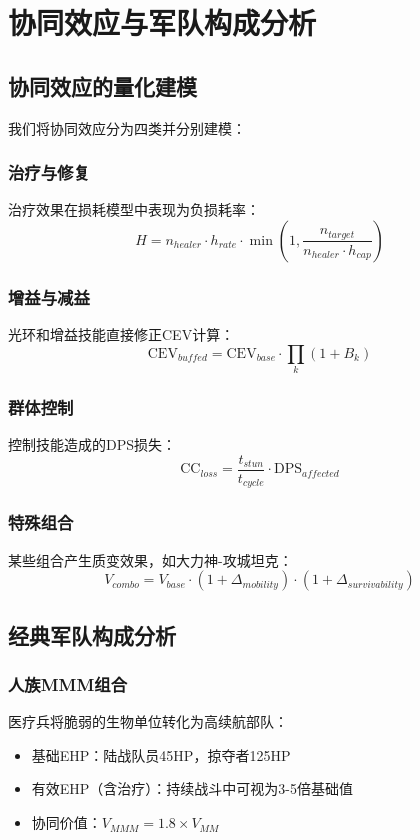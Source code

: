 \documentclass[a4paper,12pt]{article}
\begin{document}
\section{协同效应与军队构成分析}

\subsection{协同效应的量化建模}
我们将协同效应分为四类并分别建模：

\subsubsection{治疗与修复}
治疗效果在损耗模型中表现为负损耗率：
\begin{equation}
H = n_{healer} \cdot h_{rate} \cdot \min(1, \frac{n_{target}}{n_{healer} \cdot h_{cap}})
\end{equation}

\subsubsection{增益与减益}
光环和增益技能直接修正CEV计算：
\begin{equation}
\text{CEV}_{buffed} = \text{CEV}_{base} \cdot \prod_k (1 + B_k)
\end{equation}

\subsubsection{群体控制}
控制技能造成的DPS损失：
\begin{equation}
\text{CC}_{loss} = \frac{t_{stun}}{t_{cycle}} \cdot \text{DPS}_{affected}
\end{equation}

\subsubsection{特殊组合}
某些组合产生质变效果，如大力神-攻城坦克：
\begin{equation}
V_{combo} = V_{base} \cdot (1 + \Delta_{mobility}) \cdot (1 + \Delta_{survivability})
\end{equation}

\subsection{经典军队构成分析}

\subsubsection{人族MMM组合}
医疗兵将脆弱的生物单位转化为高续航部队：
\begin{itemize}
\item 基础EHP：陆战队员45HP，掠夺者125HP
\item 有效EHP（含治疗）：持续战斗中可视为3-5倍基础值
\item 协同价值：$V_{MMM} = 1.8 \times V_{MM}$
\end{itemize}
\end{document}
